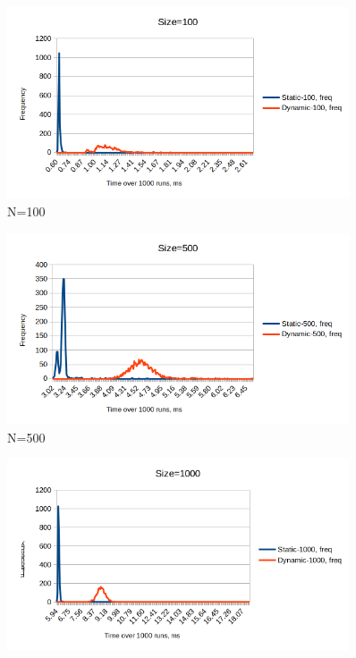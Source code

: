 \documentclass[a4paper,11pt]{article}
\begin{document}
\begin{appendices}
        \begin{figure}[H]
            \centering
            \includegraphics[width=0.9\textwidth]{size100histo.png}
            \caption{N=100}
        \end{figure}
        \begin{figure}[H]
            \centering
            \includegraphics[width=0.9\textwidth]{size500histo.png}
            \caption{N=500}
        \end{figure}
        \begin{figure}[H]
            \centering
            \includegraphics[width=0.9\textwidth]{size1000histo.png}

\end{figure}
\end{appendices}
\end{document}
